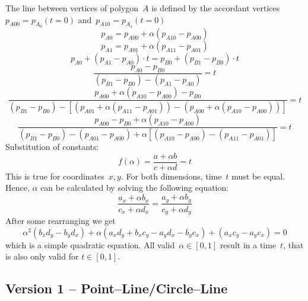 \documentclass[a4paper,10pt]{scrartcl}
\begin{document}
The line between vertices of polygon~$A$ is defined by the accordant vertices~$p_{A00} = 
p_{A_0}(t=0)$ and~$p_{A10} = p_{A_1}(t=0)$
\begin{equation}
    p_{A0} = p_{A00} + \alpha (p_{A10} - p_{A00} )
\end{equation}
\begin{equation}
    p_{A1} = p_{A01} + \alpha (p_{A11} - p_{A01} )
\end{equation}
\begin{equation}
    p_{A0} + ( p_{A1} - p_{A0} ) \cdot t = 
    p_{B0} + ( p_{B1} - p_{B0} ) \cdot t
\end{equation}
\begin{equation}
    \frac{p_{A0} - p_{B0}}
    {(p_{B1} - p_{B0}) -
     (p_{A1} - p_{A0})}
     = t
\end{equation}
\begin{equation}
    \frac{p_{A00} + \alpha (p_{A10} - p_{A00} ) -
          p_{B0}}
    {(p_{B1} - p_{B0}) -
     [(p_{A01} + \alpha (p_{A11} - p_{A01} )) -
      (p_{A00} + \alpha (p_{A10} - p_{A00} ))]
    }
     = t
\end{equation}
\begin{equation}
    \frac{p_{A00} - p_{B0} + 
          \alpha (p_{A10} - p_{A00} )
         }
         {(p_{B1} - p_{B0}) -
            (p_{A01} - p_{A00}) +
            \alpha [(p_{A10} - p_{A00} ) - 
                    (p_{A11} - p_{A01} )
                   ]
         }
     = t
\end{equation}
Substitution of constants:
\begin{equation}
    f(\alpha) = 
    \frac{a + \alpha b}
         {c + \alpha d}
     = t
\end{equation}
This is true for coordinates~$x,y$. For both dimensions, time~$t$ must be equal. Hence, $\alpha$
can be calculated by solving the following equation:
\begin{equation}
    \frac{a_x + \alpha b_x}
         {c_x + \alpha d_x}
     =
    \frac{a_y + \alpha b_y}
         {c_y + \alpha d_y}
\end{equation}
After some rearranging we get
\begin{equation}
    \alpha^2 ( b_x d_y - b_y d_x) + 
    \alpha   ( a_x d_y + b_x c_y - a_y d_x - b_y c_x) +
             ( a_x c_y - a_y c_x) = 0
\end{equation}
which is a simple quadratic equation. All valid~$\alpha \in [0,1]$ result in a
time~$t$, that is also only valid for $t \in [0,1]$.

\subsection{Version 1 -- Point--Line/Circle--Line}
\end{document}

